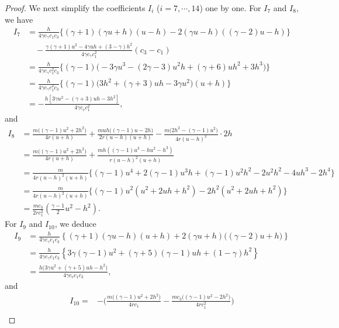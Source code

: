 \documentclass[10pt,a4paper]{amsart}
\begin{document}
\begin{proof}
We next simplify the coefficients $I_{i}$ ($i=7,\cdots, 14$) one by one. For $I_{7}$ and $I_{8}$, we have
\begin{align*}
I_{7}
&= \frac{h}{4\gamma c_\gamma c_1 c_3} \Big\{ (\gamma+1)(\gamma u+h)(u-h) - 2(\gamma u-h)((\gamma-2)u-h) \Big\} \\
&\quad - \frac{\gamma(\gamma+1)u^{2}-4\gamma uh+(3-\gamma)h^{2}}{4\gamma c_\gamma c_1^2} ( c_3 - c_1  ) \\
&= \frac{h}{4\gamma c_\gamma c_1^2 c_3} \Big\{  (\gamma-1) \big( -3\gamma u^3 - (2\gamma-3)u^2 h + (\gamma+6)uh^2 + 3h^3 \big) \Big\} \\
&= \frac{h}{4\gamma c_\gamma c_1^2 c_3} \Big\{ (\gamma-1) \big( 3h^2 + (\gamma+3)u h -3\gamma u^2  \big)(u+h) \Big\} \\
&= -\frac{h[ 3\gamma u^2-(\gamma+3)u h-3h^2  ]}{4\gamma c_v c_1^2 },
\end{align*}
and
\begin{align*}
I_{8}
&= \frac{m\big((\gamma-1)u^{2}+2h^{2}\big)}{4r (u+h)}
   + \frac{m u h\big((\gamma-1)u-2h\big)}{2r (u-h)(u+h)}
  - \frac{m\big(2h^{2}-(\gamma-1)u^{2}\big)}{4r(u-h)^{2}}
   \cdot 2h \\
&=\frac{m\big((\gamma-1)u^{2}+2h^{2}\big)}{4r (u+h)}
   +\frac{mh((\gamma-1)u^3 - hu^2 - h^3)}{r(u-h)^2(u+h)}\\
&=\frac{m}{4r(u-h)^2(u+h)} \Big\{ (\gamma - 1)u^4 + 2(\gamma - 1)u^3 h + (\gamma - 1)u^2 h^2 - 2u^2 h^2 - 4u h^3 - 2h^4 \Big\} \\
&=\frac{m}{4r(u-h)^2(u+h)} \Big\{  (\gamma-1)u^2(u^2+2uh+h^2)-2h^2(u^2+2uh+h^2) \Big\} \\
&= \frac{mc_3}{2rc_1^{2}}\left(\frac{\gamma-1}{2}u^{2} - h^{2}\right).
\end{align*}
For $I_{9}$ and $I_{10}$, we deduce
\begin{align*}
I_{9}
&=\frac{h}{4\gamma c_\gamma c_1 c_3} \left\{
      (\gamma+1)(\gamma u-h)(u+h)
      + 2(\gamma u+h)\big((\gamma-2)u+h\big)
    \right\} \\
&= \frac{h}{4\gamma c_\gamma c_1 c_3} \left\{
      3\gamma(\gamma-1)u^2 + (\gamma+5)(\gamma-1)u h + (1-\gamma)h^2
    \right\} \\
&= \frac{h\big(3\gamma u^2 + (\gamma+5)u h - h^2\big)}{4\gamma c_v c_1 c_3},
\end{align*}
and
\begin{align*}
I_{10}
=&-\bigg(\frac{m\big((\gamma-1)u^{2}+2h^{2}\big)}{4r c_1}- \frac{m c_3\big((\gamma-1)u^{2}-2h^{2}\big)}{4r c_1^2}\bigg) \\
&

\end{align*}
\end{proof}
\end{document}
